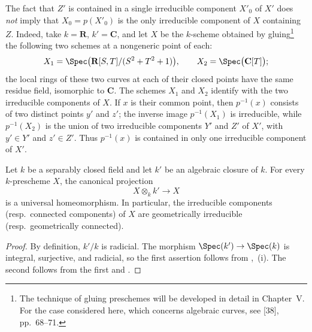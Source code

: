 \begin{remark}[4.5.20]
\label{IV.4.5.20}
The fact that $Z'$ is contained in a single irreducible component
$X'_0$ of $X'$ does \emph{not} imply that
$X_0=p(X'_0)$ is the only irreducible component of $X$ containing
$Z$.
Indeed, take $k=\mathbf R$, $k'=\mathbf C$, and let $X$ be the
$k$-scheme obtained by gluing\footnote{The technique of gluing
preschemes will be developed in detail in Chapter~V.  For the case
considered here, which concerns algebraic curves, see [38],
pp.~68--71.} the following two schemes at a nongeneric point of each:
\[
X_1=\Spec\bigl(\mathbf R[S,T]/(S^2+T^2+1)\bigr),
\qquad
X_2=\Spec\bigl(\mathbf C[T]\bigr);
\]
the local rings of these two curves at each of their closed points
have the same residue field, isomorphic to $\mathbf C$.
The schemes $X_1$ and $X_2$ identify with the two irreducible
components of $X$.
If $x$ is their common point, then $p^{-1}(x)$ consists of two
distinct points $y'$ and $z'$; the inverse image $p^{-1}(X_1)$ is
irreducible, while $p^{-1}(X_2)$ is the union of two irreducible
components $Y'$ and $Z'$ of $X'$, with $y'\in Y'$ and $z'\in Z'$.
Thus $p^{-1}(x)$ is contained in only one irreducible component of
$X'$.
\end{remark}

\begin{proposition}[4.5.21]
\label{IV.4.5.21}
Let $k$ be a separably closed field and let $k'$ be an algebraic
closure of $k$.
For every $k$-prescheme $X$, the canonical projection
\[
X\otimes_k k'\longrightarrow X
\]
is a universal homeomorphism.
In particular, the irreducible components (resp.\ connected
components) of $X$ are geometrically irreducible
(resp.\ geometrically connected).
\end{proposition}


\begin{proof}
By definition, $k'/k$ is radicial.
The morphism $\Spec(k')\to\Spec(k)$ is integral, surjective, and
radicial, so the first assertion follows from
,~(i).
The second follows from the first and .
\end{proof}

